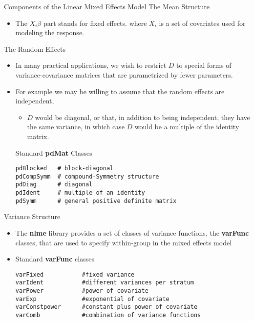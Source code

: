 \documentclass{beamer}
\begin{document}
\begin{frame}{Components of the Linear Mixed Effects Model}
The Mean Structure
\begin{itemize}
\item The  $ X_{i} \beta $ part stands for fixed effects.
where $ X_{i} $ is a set of covariates used for modeling the response.
\end{itemize}
\end{frame}


\begin{frame}[fragile]{The Random Effects}
\begin{itemize}
\item In many practical applications, we wish to restrict $D$ to special forms of variance-covariance matrices that are parametrized by fewer parameters.
\item For example we may be willing to assume that the random effects are independent,
\begin{itemize}
\item $D$ would be diagonal, or that, in addition to being independent, they have the same variance, in which case $D$ would be a multiple of the identity matrix.
\end{itemize}
Standard  \textbf{pdMat }Classes
\begin{verbatim}
pdBlocked   # block-diagonal
pdCompSymm  # compound-Symmetry structure
pdDiag      # diagonal
pdIdent     # multiple of an identity
pdSymm      # general positive definite matrix
\end{verbatim}
\end{itemize}
\end{frame}

\begin{frame}[fragile]{Variance  Structure}
\begin{itemize}
\item The \textbf{nlme} library provides a set of classes of variance functions, the \textbf{varFunc} classes, that are used to specify within-group in the mixed effects model
\item Standard \textbf{varFunc} classes
\begin{verbatim}
varFixed	       #fixed variance
varIdent	       #different variances per stratum
varPower	       #power of covariate
varExp	           #exponential of covariate
varConstpower	   #constant plus power of covariate
varComb	           #combination of variance functions
\end{verbatim}
\end{itemize}
\end{frame}
\end{document}
